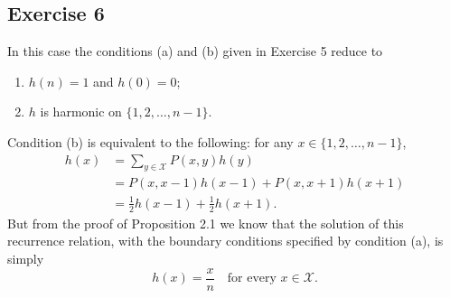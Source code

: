 \documentclass[12pt]{article}
\begin{document}
\subsection*{Exercise 6}

In this case the conditions (a) and (b) given in Exercise 5 reduce to
\begin{enumerate}[label=(\alph*)]
\item
$h(n) = 1$ and $h(0) = 0$;

\item
$h$ is harmonic on $\{1, 2, \ldots, n-1\}$.

\end{enumerate}
Condition (b) is equivalent to the following: for any $x \in \{1, 2, \ldots, n-1\}$,
\begin{align*}
h(x) &= \sum_{y \in \mathcal{X}} P(x, y) h(y) \\
&= P(x, x-1) h(x-1) + P(x, x+1) h(x+1) \\
&= \frac{1}{2} h(x-1) + \frac{1}{2} h(x+1).
\end{align*}
But from the proof of Proposition 2.1 we know that the solution of this recurrence relation, with the boundary conditions specified by condition (a), is simply
\begin{equation*}
h(x) = \frac{x}{n} \quad \text{for every $x \in \mathcal{X}$}.
\end{equation*}
\end{document}
